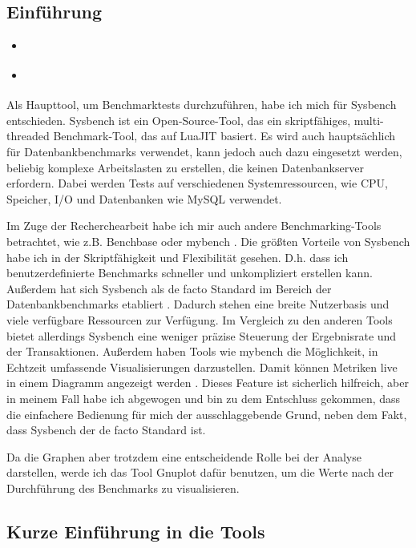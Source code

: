\subsection{Einführung}\label{subsec:einfuhrung}

\begin{itemize}
    \item \cite{sysbench_mysql}
    \item \cite{sysbench_repo}
\end{itemize}

Als Haupttool, um Benchmarktests durchzuführen, habe ich mich für Sysbench entschieden. Sysbench ist ein Open-Source-Tool, das ein skriptfähiges, multi-threaded Benchmark-Tool, das auf LuaJIT basiert. Es wird auch hauptsächlich für Datenbankbenchmarks verwendet, kann jedoch auch dazu eingesetzt werden, beliebig komplexe Arbeitslasten zu erstellen, die keinen Datenbankserver erfordern. Dabei werden Tests auf verschiedenen Systemressourcen, wie CPU, Speicher, I/O und Datenbanken wie MySQL verwendet.

Im Zuge der Recherchearbeit habe ich mir auch andere Benchmarking-Tools betrachtet, wie z.B. Benchbase \cite{DifallahPCC13} oder mybench \cite{mybench_repo}. Die größten Vorteile von Sysbench habe ich in der Skriptfähigkeit und Flexibilität gesehen. D.h. dass ich benutzerdefinierte Benchmarks schneller und unkompliziert erstellen kann. Außerdem hat sich Sysbench als de facto Standard im Bereich der Datenbankbenchmarks etabliert \cite{mybench_comparison}. Dadurch stehen eine breite Nutzerbasis und viele verfügbare Ressourcen zur Verfügung. Im Vergleich zu den anderen Tools bietet allerdings Sysbench eine weniger präzise Steuerung der Ergebnisrate und der Transaktionen. Außerdem haben Tools wie mybench die Möglichkeit, in Echtzeit umfassende Visualisierungen darzustellen. Damit können Metriken live in einem Diagramm angezeigt werden \cite{mybench_user_interface}. Dieses Feature ist sicherlich hilfreich, aber in meinem Fall habe ich abgewogen und bin zu dem Entschluss gekommen, dass die einfachere Bedienung für mich der ausschlaggebende Grund, neben dem Fakt, dass Sysbench der de facto Standard ist.

Da die Graphen aber trotzdem eine entscheidende Rolle bei der Analyse darstellen, werde ich das Tool Gnuplot \cite{gnuplot} dafür benutzen, um die Werte nach der Durchführung des Benchmarks zu visualisieren.

\subsection{Kurze Einführung in die Tools}\label{sec:kurze-einfuhrung-in-die-tools}

